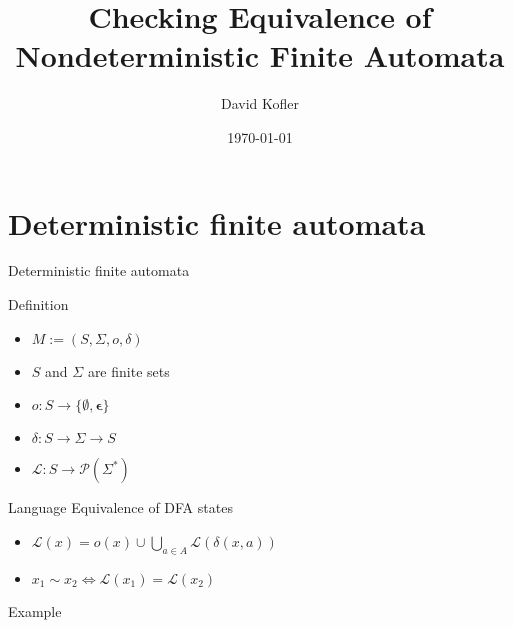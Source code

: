 \documentclass[compress]{beamer}
\title{Checking Equivalence of Nondeterministic Finite Automata}
\author{David Kofler}
\date{\today}
\institute{Master Seminar 2 \newline University of Innsbruck \newline Institute of Computer Science}
\begin{document}
\begin{frame}{}
	\maketitle
\end{frame}

\begin{frame}{}
	\tableofcontents
\end{frame}

\section{Deterministic finite automata}

\begin{frame}{Deterministic finite automata}
  \begin{block}{Definition}
    \begin{itemize}
      \item $M := (S, \Sigma, o, \delta)$
      \item $S$ and $\Sigma$ are finite sets
      \item $o : S \to \{\emptyset, \mathbf{\epsilon} \}$
      \item $\delta : S \to \Sigma \to S$
      \item $\mathcal{L} : S \to \mathcal{P}(\Sigma^\ast)$
    \end{itemize}
  \end{block}

  \begin{block}{Language Equivalence of DFA states}
    \begin{itemize}
      \item $\mathcal{L}(x) = o(x) \cup \bigcup_{a \in A}{\mathcal{L}({\delta(x, a)})}$
      \item $x_1 \sim x_2 \Leftrightarrow \mathcal{L}(x_1) = \mathcal{L}(x_2)$
    \end{itemize}
  \end{block}
\end{frame}

\begin{frame}{Example}
  \begin{figure}
  \end{figure}
\end{frame}
\end{document}
